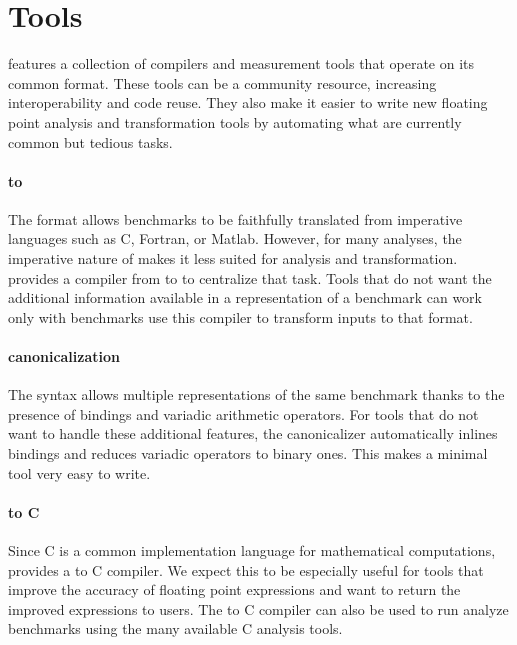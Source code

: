 \documentclass[main.tex]{subfiles}
\begin{document}
\section{Tools}
\label{sec:tools}

\name features
  a collection of compilers and measurement tools
  that operate on its common format.
These tools can be a community resource,
  increasing interoperability and code reuse.
They also make it easier to write
  new floating point analysis and transformation tools
  by automating what are currently
  common but tedious tasks.

\paragraph{\surface to \core}
The \surface format allows \name benchmarks
  to be faithfully translated from imperative languages
  such as C, Fortran, or Matlab.
However, for many analyses,
  the imperative nature of \surface
  makes it less suited for analysis and transformation.
\name provides a compiler from \surface to \core
  to centralize that task.
Tools that do not want the additional information
  available in a \surface representation of a benchmark
  can work only with \core benchmarks
  use this compiler to transform inputs to that format.

\paragraph{\core canonicalization}
The \core syntax allows multiple representations of the same benchmark
  thanks to the presence of  bindings and variadic arithmetic operators.
For tools that do not want to handle these additional features,
  the canonicalizer automatically inlines  bindings
  and reduces variadic operators to binary ones.
This makes a minimal \name tool very easy to write.

\paragraph{\core to C}
Since C is a common implementation language for mathematical computations,
  \name provides a \core to C compiler.
We expect this to be especially useful for tools
  that improve the accuracy of floating point expressions
  and want to return the improved expressions to users.
The \core to C compiler can also be used
  to run analyze \name benchmarks
  using the many available C analysis tools.
\end{document}

